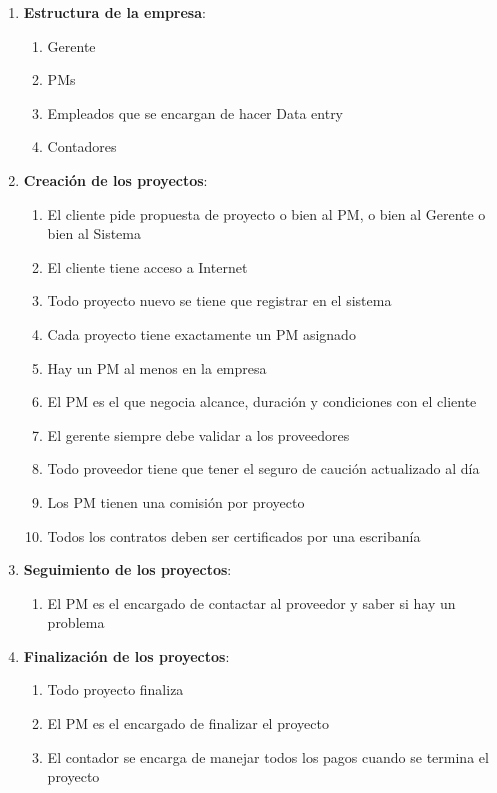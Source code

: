 \begin{enumerate}
    \item \textbf{Estructura de la empresa}:
    \begin{enumerate}
        \item Gerente
        \item PMs
        \item Empleados que se encargan de hacer Data entry
        \item Contadores
    \end{enumerate}    
    \item \textbf{Creación de los proyectos}:
    \begin{enumerate}
        \item El cliente pide propuesta de proyecto o bien al PM, o bien al Gerente o bien al Sistema
        \item El cliente tiene acceso a Internet
        \item Todo proyecto nuevo se tiene que registrar en el sistema
        \item Cada proyecto tiene exactamente un PM asignado
        \item Hay un PM al menos en la empresa
        \item El PM es el que negocia alcance, duración y condiciones con el cliente
        \item El gerente siempre debe validar a los proveedores
        \item Todo proveedor tiene que tener el seguro de caución actualizado al día
        \item Los PM tienen una comisión por proyecto
        \item Todos los contratos deben ser certificados por una escribanía
    \end{enumerate}    
    \item \textbf{Seguimiento de los proyectos}:
    \begin{enumerate}
        \item El PM es el encargado de contactar al proveedor y saber si hay un problema
    \end{enumerate}
    \item \textbf{Finalización de los proyectos}:
    \begin{enumerate}
        \item Todo proyecto finaliza
        \item El PM es el encargado de finalizar el proyecto
        \item El contador se encarga de manejar todos los pagos cuando se termina el proyecto
    \end{enumerate}
\end{enumerate}
